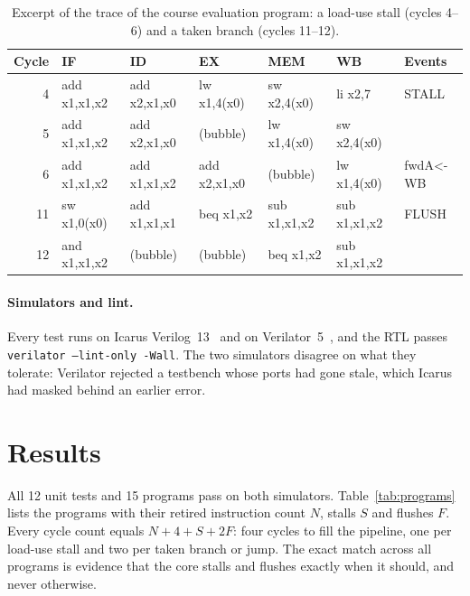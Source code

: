 \documentclass[12pt]{article}
\begin{document}
\begin{table}[ht]
\centering
\caption{Excerpt of the trace of the course evaluation program: a load-use stall
(cycles 4--6) and a taken branch (cycles 11--12).}
\label{tab:trace}
\scriptsize\ttfamily
\setlength{\tabcolsep}{3.5pt}
\begin{tabular}{rllllll}
\toprule
\rmfamily Cycle & \rmfamily IF & \rmfamily ID & \rmfamily EX & \rmfamily MEM & \rmfamily WB & \rmfamily Events \\
\midrule
4  & add x1,x1,x2 & add x2,x1,x0 & lw x1,4(x0)  & sw x2,4(x0)  & li x2,7      & STALL \\
5  & add x1,x1,x2 & add x2,x1,x0 & (bubble)     & lw x1,4(x0)  & sw x2,4(x0)  & \\
6  & add x1,x1,x2 & add x1,x1,x2 & add x2,x1,x0 & (bubble)     & lw x1,4(x0)  & fwdA<-WB \\
11 & sw x1,0(x0)  & add x1,x1,x1 & beq x1,x2    & sub x1,x1,x2 & sub x1,x1,x2 & FLUSH \\
12 & and x1,x1,x2 & (bubble)     & (bubble)     & beq x1,x2    & sub x1,x1,x2 & \\
\bottomrule
\end{tabular}
\end{table}

\paragraph{Simulators and lint.}
Every test runs on Icarus Verilog~13~\cite{icarus} and on Verilator~5~\cite{verilator},
and the RTL passes \texttt{verilator --lint-only -Wall}. The two simulators
disagree on what they tolerate: Verilator rejected a testbench whose ports had
gone stale, which Icarus had masked behind an earlier error.

\section{Results}

All 12 unit tests and 15 programs pass on both simulators. Table~\ref{tab:programs}
lists the programs with their retired instruction count $N$, stalls $S$ and
flushes $F$. Every cycle count equals $N + 4 + S + 2F$: four cycles to fill the
pipeline, one per load-use stall and two per taken branch or jump. The exact
match across all programs is evidence that the core stalls and flushes exactly
when it should, and never otherwise.
\end{document}
